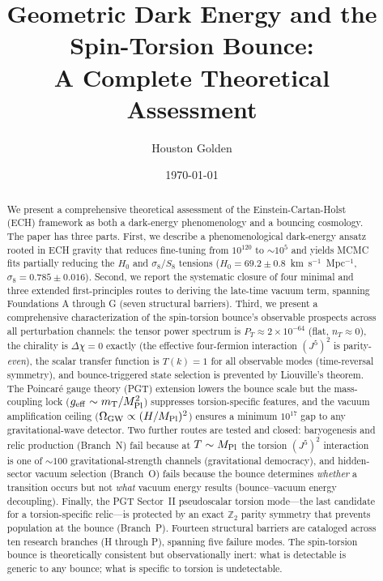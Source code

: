 \documentclass[aps,prd,twocolumn,superscriptaddress,showpacs,preprintnumbers,
  nofootinbib,longbibliography,floatfix]{revtex4-2}
\newcommand{\MPl}{M_{\rm Pl}}
\newcommand{\OmGW}{\Omega_{\rm GW}}
\newcommand{\mT}{m_{\rm T}}
\newcommand{\geff}{g_{\rm eff}}
\begin{document}

\title{Geometric Dark Energy and the Spin-Torsion Bounce:\\
A Complete Theoretical Assessment}

\author{Houston Golden}

\date{\today}

\begin{abstract}
We present a comprehensive theoretical assessment of the Einstein-Cartan-Holst
(ECH) framework as both a dark-energy phenomenology and a bouncing cosmology.
The paper has three parts. First, we describe a phenomenological dark-energy
ansatz rooted in ECH gravity that reduces fine-tuning from $10^{120}$ to
$\sim\!10^5$ and yields MCMC fits partially reducing the $H_0$ and
$\sigma_8/S_8$ tensions ($H_0 = 69.2 \pm 0.8$~km~s$^{-1}$~Mpc$^{-1}$,
$\sigma_8 = 0.785 \pm 0.016$). Second, we report the systematic closure
of four minimal and three extended first-principles routes to deriving
the late-time vacuum term, spanning Foundations A through G (seven
structural barriers). Third, we present a comprehensive characterization
of the spin-torsion bounce's observable prospects across all perturbation
channels: the tensor power spectrum is $P_T \approx 2\times 10^{-64}$
(flat, $n_T \approx 0$), the chirality is $\Delta\chi = 0$ exactly
(the effective four-fermion interaction $(J^5)^2$ is parity-\textit{even}),
the scalar transfer function is $T(k)=1$ for all observable modes
(time-reversal symmetry), and bounce-triggered state selection is
prevented by Liouville's theorem. The Poincar\'e gauge theory (PGT)
extension lowers the bounce scale but the mass-coupling lock
($\geff \sim \mT/\MPl^2$) suppresses torsion-specific features, and the
vacuum amplification ceiling ($\OmGW \propto (H/\MPl)^2$) ensures a
minimum $10^{17}$ gap to any gravitational-wave detector. Two further
routes are tested and closed: baryogenesis and relic production
(Branch~N) fail because at $T\sim\MPl$ the torsion $(J^5)^2$ interaction
is one of $\sim\!100$ gravitational-strength channels (gravitational
democracy), and hidden-sector vacuum selection (Branch~O) fails because
the bounce determines \textit{whether} a transition occurs but not
\textit{what} vacuum energy results (bounce--vacuum energy decoupling).
Finally, the PGT Sector~II pseudoscalar torsion mode---the last candidate
for a torsion-specific relic---is protected by an exact $\mathbb{Z}_2$
parity symmetry that prevents population at the bounce (Branch~P).
Fourteen structural barriers are cataloged across ten research branches
(H through P), spanning five failure modes. The spin-torsion bounce is
theoretically consistent but observationally inert: what is detectable is
generic to any bounce; what is specific to torsion is undetectable.
\end{abstract}
\end{document}
